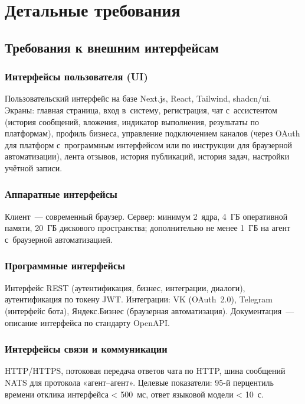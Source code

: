 
\chapter{Детальные требования}
\label{ch:detailed}

\section{Требования к внешним интерфейсам}
\label{sec:interfaces}

\subsection{Интерфейсы пользователя (UI)}
\label{subsec:ui}

Пользовательский интерфейс на базе Next.js, React, Tailwind, shadcn/ui. Экраны: главная страница, вход в~систему, регистрация, чат с~ассистентом (история сообщений, вложения, индикатор выполнения, результаты по платформам), профиль бизнеса, управление подключением каналов (через OAuth для платформ с~программным интерфейсом или по инструкции для браузерной автоматизации), лента отзывов, история публикаций, история задач, настройки учётной записи.

\subsection{Аппаратные интерфейсы}
\label{subsec:hardware}

Клиент~--- современный браузер. Сервер: минимум 2~ядра, 4~ГБ оперативной памяти, 20~ГБ дискового пространства; дополнительно не менее 1~ГБ на агент с~браузерной автоматизацией.

\subsection{Программные интерфейсы}
\label{subsec:software}

Интерфейс REST (аутентификация, бизнес, интеграции, диалоги), аутентификация по токену JWT. Интеграции: VK (OAuth~2.0), Telegram (интерфейс бота), Яндекс.Бизнес (браузерная автоматизация). Документация~--- описание интерфейса по стандарту OpenAPI.

\subsection{Интерфейсы связи и коммуникации}
\label{subsec:communication}

HTTP/HTTPS, потоковая передача ответов чата по HTTP, шина сообщений NATS для протокола «агент--агент». Целевые показатели: 95-й перцентиль времени отклика интерфейса < 500~мс, ответ языковой модели < 10~с.
